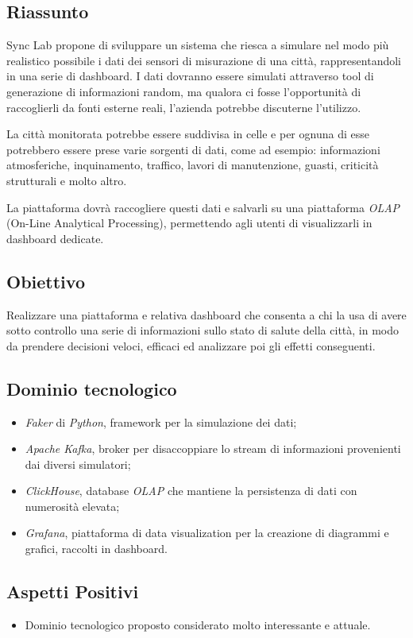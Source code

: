\documentclass{article}
\begin{document}
\subsection{Riassunto}
Sync Lab propone di sviluppare un sistema che riesca a simulare nel modo più realistico possibile i dati dei sensori di misurazione di una città, rappresentandoli in una serie di dashboard.
I dati dovranno essere simulati attraverso tool di generazione di informazioni random, ma qualora ci fosse l’opportunità di raccoglierli da fonti esterne reali, l’azienda potrebbe discuterne l’utilizzo.

La città monitorata potrebbe essere suddivisa in celle e per ognuna di esse potrebbero essere prese varie sorgenti di dati, come ad esempio: informazioni atmosferiche, inquinamento, traffico, lavori di manutenzione, guasti, criticità strutturali e molto altro.

La piattaforma dovrà raccogliere questi dati e salvarli su una piattaforma \textit{OLAP} (On-Line Analytical Processing), permettendo agli utenti di visualizzarli in dashboard dedicate.

\subsection{Obiettivo}
Realizzare una piattaforma e relativa dashboard che consenta a chi la usa di avere sotto controllo una serie di informazioni sullo stato di salute della città, in modo da prendere decisioni veloci, efficaci ed analizzare poi gli effetti conseguenti.


\subsection{Dominio tecnologico}
\begin{itemize}
    \item \textit{Faker} di \textit{Python}, framework per la simulazione dei dati;
    \item \textit{Apache Kafka}, broker per disaccoppiare lo stream di informazioni provenienti dai diversi simulatori;
    \item \textit{ClickHouse}, database \textit{OLAP} che mantiene la persistenza di dati con numerosità elevata;
    \item \textit{Grafana}, piattaforma di data visualization per la creazione di diagrammi e grafici, raccolti in dashboard.
\end{itemize}

\subsection{Aspetti Positivi}
\begin{itemize}
    \item Dominio tecnologico proposto considerato molto interessante e attuale.

\end{itemize}
\end{document}
